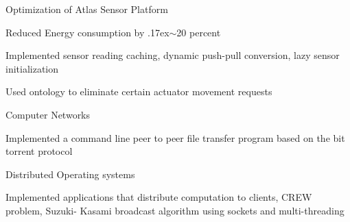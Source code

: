 \documentclass[10pt]{article}
\newenvironment{outerlist}[1][\enskip\textbullet]%
        {\begin{itemize}[#1]}{\end{itemize}%
         \vspace{-.6\baselineskip}}
\newenvironment{innerlist}[1][\enskip\textbullet]%
        {\begin{compactitem}[#1]}{\end{compactitem}}
\newcommand{\halfblankline}{\quad\vspace{-0.5\baselineskip}\pagebreak[3]}
\begin{document}
\begin{outerlist}
\begin{innerlist}
\begin{innerlist}
\begin{innerlist}
        \end{innerlist}
        \halfblankline
              \item Optimization of Atlas Sensor Platform
        \begin{innerlist}
            \item Reduced Energy consumption by {\raise.17ex\hbox{$\scriptstyle\mathtt{\sim}$}}20 percent
            \item Implemented sensor reading caching, dynamic push-pull conversion, lazy sensor initialization
            \item Used ontology to eliminate certain actuator movement requests
        \end{innerlist}
      \end{innerlist}
        \halfblankline

                \item[] Computer Networks
        \begin{innerlist}
            \item Implemented a command line peer to peer file transfer program based on the bit torrent protocol
        \end{innerlist}

        \halfblankline

        \item[] Distributed Operating systems
        \begin{innerlist}
            \item Implemented applications that distribute computation to clients, CREW problem, Suzuki- Kasami broadcast algorithm using sockets and multi-threading
        \end{innerlist}

        \halfblankline

%

       \end{innerlist}

\end{outerlist}
\end{document}
